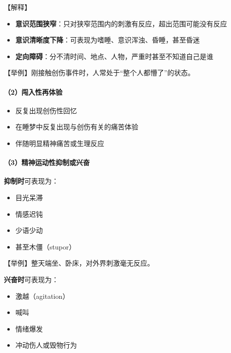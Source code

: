 \documentclass[
  chinese,
  9pt,
  a4paper,
]{ctexart}
\providecommand{\tightlist}{%
  \setlength{\itemsep}{0pt}\setlength{\parskip}{0pt}}
\begin{document}
【解释】

\begin{itemize}
\tightlist
\item
  \textbf{意识范围狭窄}：只对狭窄范围内的刺激有反应，超出范围可能没有反应
\item
  \textbf{意识清晰度下降}：可表现为嗜睡、意识浑浊、昏睡，甚至昏迷
\item
  \textbf{定向障碍}：分不清时间、地点、人物，严重时甚至不知道自己是谁
\end{itemize}

【举例】刚接触创伤事件时，人常处于``整个人都懵了''的状态。

\paragraph{（2）闯入性再体验}\label{ux95efux5165ux6027ux518dux4f53ux9a8c}

\begin{itemize}
\tightlist
\item
  反复出现创伤性回忆
\item
  在睡梦中反复出现与创伤有关的痛苦体验
\item
  伴随明显精神痛苦或生理反应
\end{itemize}

\paragraph{（3）精神运动性抑制或兴奋}\label{ux7cbeux795eux8fd0ux52a8ux6027ux6291ux5236ux6216ux5174ux594b}

\textbf{抑制时}可表现为：

\begin{itemize}
\tightlist
\item
  目光呆滞
\item
  情感迟钝
\item
  少语少动
\item
  甚至木僵（stupor）
\end{itemize}

【举例】整天端坐、卧床，对外界刺激毫无反应。

\textbf{兴奋时}可表现为：

\begin{itemize}
\tightlist
\item
  激越（agitation）
\item
  喊叫
\item
  情绪爆发
\item
  冲动伤人或毁物行为
\end{itemize}
\end{document}
